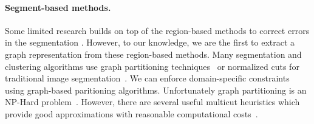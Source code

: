 \paragraph{Segment-based methods.} 

Some limited research builds on top of the region-based methods to correct errors in the segmentation \cite{rolnick2017morphological,error_correction_using_CNN,haehn2017guided}. 
However, to our knowledge, we are the first to extract a graph representation from these region-based methods. 
Many segmentation and clustering algorithms use graph partitioning techniques~\cite{andres2012globally} or normalized cuts for traditional image segmentation~\cite{kappes2016higher,shi2000normalized,tatiraju2008image}. 
We can enforce domain-specific constraints using graph-based paritioning algorithms.  
Unfortunately graph partitioning is an NP-Hard problem~\cite{demaine2006correlation}.
However, there are several useful multicut heuristics which provide good approximations with reasonable computational costs~\cite{horvnakova2017analysis,keuper2015efficient}.

